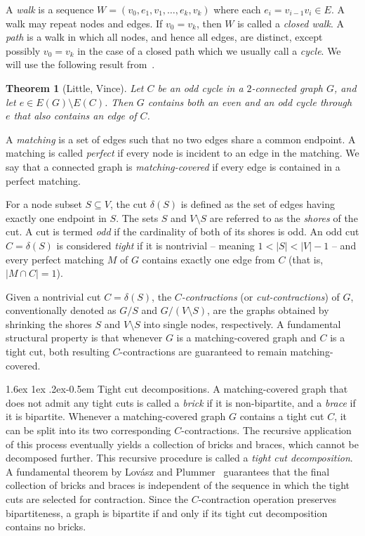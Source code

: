 \documentclass{article}
\makeatletter
\renewcommand{\paragraph}{%
  \@startsection{paragraph}{4}%
  {\z@}{1.6ex \@plus 1ex \@minus .2ex}{-0.5em}%
  {\normalfont\normalsize\bfseries}%
}
\theoremstyle{plain}
\newtheorem{thm}{Theorem}[section]
\theoremstyle{definition}
\makeatother
\begin{document}
A \emph{walk} is a sequence $W = (v_0, e_1, v_1, \dots, e_k, v_k)$ where each $e_i = v_{i-1}v_i \in E$. A walk may repeat nodes and edges. If $v_0 = v_k$, then $W$ is called a \emph{closed walk}. A \emph{path} is a walk in which all nodes, and hence all edges, are distinct, except possibly $v_0 = v_k$ in the case of a closed path which we usually call a \emph{cycle}. We will use the following result from~\cite{little2006parity}.

\begin{thm}[Little, Vince]\label{thm:even_odd}
    Let $C$ be an odd cycle in a $2$-connected graph $G$, and let $e \in E(G) \setminus E(C)$. Then $G$ contains both an even and an odd cycle through $e$ that also contains an edge of $C$.
\end{thm}

A \emph{matching} is a set of edges such that no two edges share a common endpoint. A matching is called \emph{perfect} if every node is incident to an edge in the matching. We say that a connected graph is \emph{matching-covered} if every edge is contained in a perfect matching. 

For a node subset $S \subseteq V$, the cut $\delta(S)$ is defined as the set of edges having exactly one endpoint in $S$. The sets $S$ and $V \setminus S$ are referred to as the \emph{shores} of the cut. A cut is termed \emph{odd} if the cardinality of both of its shores is odd. An odd cut $C = \delta(S)$ is considered \emph{tight} if it is nontrivial -- meaning $1 < |S| < |V| - 1$ -- and every perfect matching $M$ of $G$ contains exactly one edge from $C$ (that is, $|M \cap C| = 1$).

Given a nontrivial cut $C = \delta(S)$, the \emph{$C$-contractions} (or \emph{cut-contractions}) of $G$, conventionally denoted as $G/S$ and $G/(V \setminus S)$, are the graphs obtained by shrinking the shores $S$ and $V \setminus S$ into single nodes, respectively. A fundamental structural property is that whenever $G$ is a matching-covered graph and $C$ is a tight cut, both resulting $C$-contractions are guaranteed to remain matching-covered. 

\paragraph{Tight cut decompositions.} A matching-covered graph that does not admit any tight cuts is called a \emph{brick} if it is non-bipartite, and a \emph{brace} if it is bipartite. Whenever a matching-covered graph $G$ contains a tight cut $C$, it can be split into its two corresponding $C$-contractions. The recursive application of this process eventually yields a collection of bricks and braces, which cannot be decomposed further. This recursive procedure is called a \emph{tight cut decomposition}. A fundamental theorem by Lovász and Plummer~\cite{lovasz1986matching} guarantees that the final collection of bricks and braces is independent of the sequence in which the tight cuts are selected for contraction. Since the $C$-contraction operation preserves bipartiteness, a graph is bipartite if and only if its tight cut decomposition contains no bricks.
\end{document}
